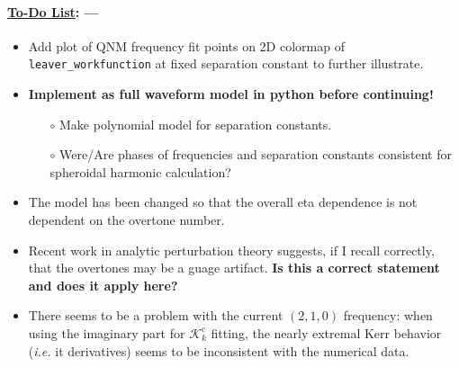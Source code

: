 \documentclass[twocolumn,prd,floatfix,preprintnumbers,a4paper,nofootinbib,superscriptaddress]{revtex4-1}
\newcommand{\SCc}{\mathcal{K}^{\mathrm{c}}}
\begin{document}
{\paragraph{\ul{To-Do List}: --- }
%
\begin{itemize}
	\item Add plot of QNM frequency fit points on 2D colormap of \texttt{leaver\_workfunction} at fixed separation constant to further illustrate.
	\item \textbf{Implement as full waveform model in python before continuing!}
	\begin{itemize}
		\item[$\circ$] Make polynomial model for separation constants.
		\item[$\circ$] Were/Are phases of frequencies and separation constants consistent for spheroidal harmonic calculation?
	\end{itemize}
	\item The model has been changed so that the overall eta dependence is not dependent on the overtone number.
	\item Recent work in analytic perturbation theory suggests, if I recall correctly, that the overtones may be a guage artifact. \textbf{Is this a correct statement and does it apply here?}
	\item There seems to be a problem with the current $(2,1,0)$ \qnm{} frequency: when using the imaginary part for $\SCc_k$ fitting, the nearly extremal Kerr behavior (\textit{i.e.} it derivatives) seems to be inconsistent with the numerical data.
\end{itemize}

}

%
\appendix

%
\end{document}
